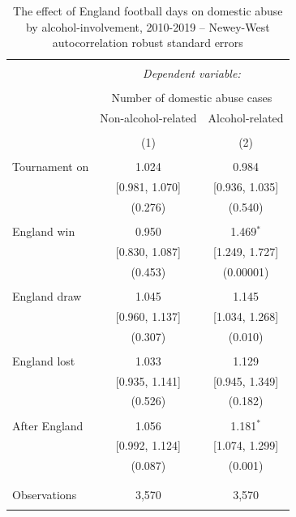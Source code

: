 \documentclass[12pt, a4paper]{article}
\begin{document}
\begin{table}[!htbp] \centering
  \begin{threeparttable}
  \caption{The effect of England football days on domestic abuse by alcohol-involvement, 2010-2019 -- Newey-West autocorrelation robust standard errors}
  \label{coremodelnw}
\begin{tabular}{@{\extracolsep{5pt}}lcc}
\\[-1.8ex]\hline
\hline \\[-1.8ex]
  & \multicolumn{2}{c}{\textit{Dependent variable:}} \\
\cline{2-3}
\\[-1.8ex] & \multicolumn{2}{c}{Number of domestic abuse cases} \\
 & Non-alcohol-related & Alcohol-related\\
\\[-1.8ex] & (1) & (2)\\
\hline \\[-1.8ex]
 Tournament on & 1.024 & 0.984 \\
  & [0.981, 1.070] & [0.936, 1.035] \\
  & (0.276) & (0.540) \\
  & & \\
 England win & 0.950 & 1.469$^{*}$ \\
  & [0.830, 1.087] & [1.249, 1.727] \\
  & (0.453) & (0.00001) \\
  & & \\
 England draw & 1.045 & 1.145 \\
  & [0.960, 1.137] & [1.034, 1.268] \\
  & (0.307) & (0.010) \\
  & & \\
 England lost & 1.033 & 1.129 \\
  & [0.935, 1.141] & [0.945, 1.349] \\
  & (0.526) & (0.182) \\
  & & \\
  After England & 1.056 & 1.181$^{*}$ \\
  & [0.992, 1.124] & [1.074, 1.299] \\
  & (0.087) & (0.001) \\
  & & \\
\hline \\[-1.8ex]
Observations & 3,570 & 3,570 \\
\hline
\hline \\[-1.8ex]


\end{tabular}
\end{threeparttable}
\end{table}
\end{document}
